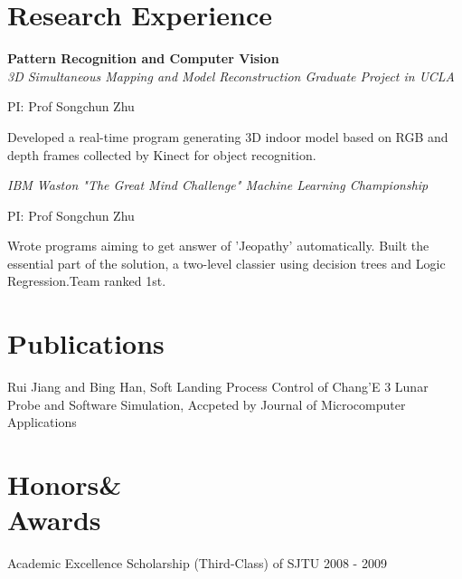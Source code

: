 \documentclass[margin,line]{resume}
\begin{document}
\begin{resume}
\section{\mystyle Research Experience}
\textbf{Pattern Recognition and Computer Vision}\\
\textit{3D Simultaneous Mapping and Model Reconstruction Graduate Project in UCLA}
\begin{list2}
\item PI: Prof Songchun Zhu
\item Developed a real-time program generating 3D indoor model based on RGB and
depth frames collected by Kinect for object recognition.
\end{list2}
\textit{IBM Waston "The Great Mind Challenge" Machine
Learning Championship}
\begin{list2}
\item PI: Prof Songchun Zhu
\item Wrote programs aiming to get answer of 'Jeopathy' automatically. Built the essential part of the
solution, a two-level classier using decision trees and Logic Regression.Team ranked 1st.
\end{list2}

\section{\mystyle Publications}
\begin{list2}
\item Rui Jiang and Bing Han, Soft Landing Process Control of Chang’E 3 Lunar Probe and Software Simulation, Accpeted by Journal of Microcomputer Applications
\end{list2}
\section{\mystyle Honors\&\\Awards}
\begin{list2}
\item Academic Excellence Scholarship (Third-Class) of SJTU \hfill {2008 - 2009}
\end{list2}
\end{resume}
\end{document}
